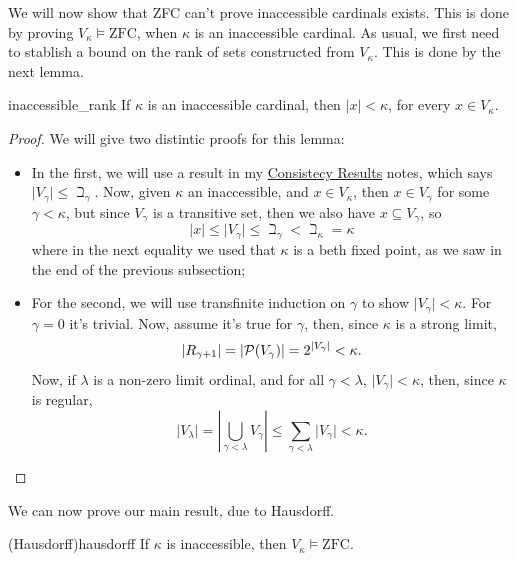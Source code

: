We will now show that ZFC can't prove inaccessible cardinals exists. This is done by proving $V_\kappa\vDash\text{ZFC}$, when $\kappa$ is an inaccessible cardinal. As usual, we first need to stablish a bound on the rank of sets constructed from $V_\kappa$. This is done by the next lemma.

\begin{lemma}{}{inaccessible_rank}
    If $\kappa$ is an inaccessible cardinal, then $\lvert x\rvert<\kappa$, for every $x\in V_\kappa$.
\end{lemma}

\begin{proof}
    We will give two distintic proofs for this lemma:
    \begin{itemize}
        \item In the first, we will use a result in my \href{https://github.com/Xennonio/Consistency-Results}{Consistecy Results} notes, which says $\lvert V_\gamma\rvert\leq \beth_\gamma$. Now, given $\kappa$ an inaccessible, and $x\in V_\kappa$, then $x\in V_\gamma$ for some $\gamma<\kappa$, but since $V_\gamma$ is a transitive set, then we also have $x\subseteq V_\gamma$, so
        $$\lvert x\rvert\leq\lvert V_\gamma\rvert\leq\beth_\gamma<\beth_\kappa=\kappa$$
        where in the next equality we used that $\kappa$ is a beth fixed point, as we saw in the end of the previous subsection;
        \item For the second, we will use transfinite induction on $\gamma$ to show $\lvert V_\gamma\rvert<\kappa$. For $\gamma=0$ it's trivial. Now, assume it's true for $\gamma$, then, since $\kappa$ is a strong limit,
        $$\lvert R_{\gamma+1}\rvert=\lvert\mathcal{P}(V_\gamma)\rvert=2^{\lvert V_\gamma\rvert}<\kappa.$$
        Now, if $\lambda$ is a non-zero limit ordinal, and for all $\gamma<\lambda$, $\lvert V_\gamma\rvert<\kappa$, then, since $\kappa$ is regular,
        $$\lvert V_\lambda\rvert=\left\lvert\bigcup_{\gamma<\lambda}V_\gamma\right\rvert\leq\sum_{\gamma<\lambda}\lvert V_\gamma\rvert<\kappa.$$
    \end{itemize}
\end{proof}

We can now prove our main result, due to Hausdorff.

\begin{theorem}{(Hausdorff)}{hausdorff}
    If $\kappa$ is inaccessible, then $V_\kappa\vDash\text{ZFC}$.
\end{theorem}

